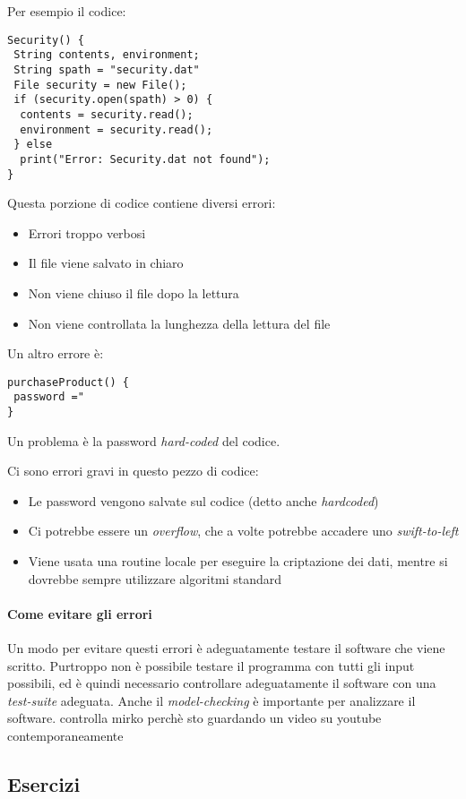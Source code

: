 Per esempio il codice:
\begin{verbatim}
Security() {
 String contents, environment;
 String spath = "security.dat"
 File security = new File();
 if (security.open(spath) > 0) {
  contents = security.read();
  environment = security.read();
 } else
  print("Error: Security.dat not found");
}
\end{verbatim}

Questa porzione di codice contiene diversi errori:
\begin{itemize}
\item Errori troppo verbosi
\item Il file viene salvato in chiaro
\item Non viene chiuso il file dopo la lettura
\item Non viene controllata la lunghezza della lettura del file
\end{itemize}

Un altro errore è:
\begin{verbatim}
purchaseProduct() {
 password ="
}
\end{verbatim}
Un problema è la password \emph{hard-coded} del codice.

Ci sono errori gravi in questo pezzo di codice:
\begin{itemize}
\item Le password vengono salvate sul codice (detto anche \textit{hardcoded})
\item Ci potrebbe essere un \textit{overflow}, che a volte potrebbe accadere uno 
\textit{swift-to-left} %
\item Viene usata una routine locale per eseguire la criptazione dei dati, 
mentre si dovrebbe sempre utilizzare algoritmi standard
\end{itemize}


\paragraph*{Come evitare gli errori} Un modo per evitare questi errori è 
adeguatamente testare il software che viene scritto. Purtroppo non è possibile 
testare il programma con tutti gli input possibili, ed è quindi necessario 
controllare adeguatamente il software con una \textit{test-suite} adeguata. 
Anche il \textit{model-checking} è importante per analizzare il software. %
controlla mirko perchè sto guardando un video su youtube contemporaneamente

\subsection{Esercizi}

